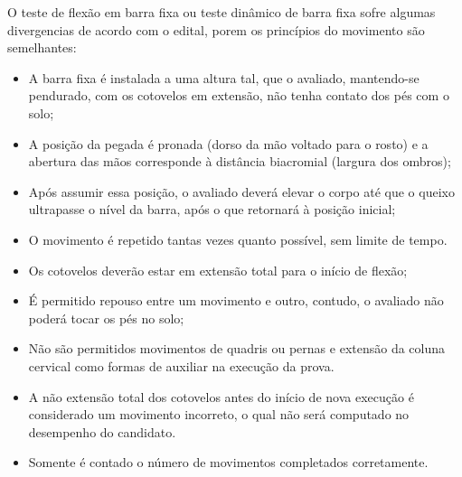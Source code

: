 O teste de flexão em barra fixa ou teste dinâmico de barra fixa sofre algumas divergencias de acordo com o edital, porem os princípios do movimento são semelhantes:

\begin{itemize}

    \item A barra fixa é instalada a uma altura tal, que o avaliado, mantendo-se pendurado, com os cotovelos em extensão, não tenha contato dos pés com o solo;

    \item A posição da pegada é pronada (dorso da mão voltado para o rosto) e a abertura das mãos corresponde à distância biacromial (largura dos ombros);

    \item Após assumir essa posição, o avaliado deverá elevar o corpo até que o queixo ultrapasse o nível da barra, após o que retornará à posição inicial;

    \item O movimento é repetido tantas vezes quanto possível, sem limite de tempo.

    \item Os cotovelos deverão estar em extensão total para o início de flexão;

    \item É permitido repouso entre um movimento e outro, contudo, o avaliado não poderá tocar os pés no solo;

    \item Não são permitidos movimentos de quadris ou pernas e extensão da coluna cervical como formas de auxiliar na execução da prova.

    \item A não extensão total dos cotovelos antes do início de nova execução é considerado um movimento incorreto, o qual não será computado no desempenho do candidato.

    \item Somente é contado o número de movimentos completados corretamente.

\end{itemize}

